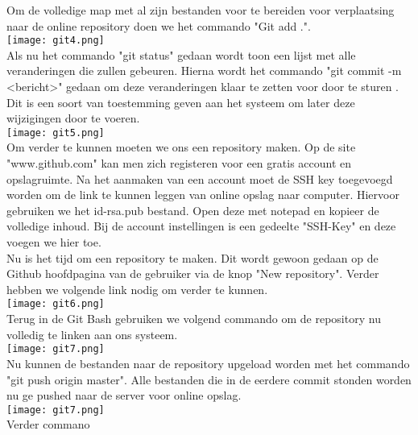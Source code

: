 Om de volledige map met al zijn bestanden voor te bereiden voor verplaatsing naar de online repository doen we het commando "Git add .".\\
\texttt{[image: git4.png]}\\

Als nu het commando "git status" gedaan wordt toon een lijst met alle veranderingen die zullen gebeuren. Hierna wordt het commando "git commit -m <bericht>" gedaan om deze veranderingen klaar te zetten voor door te sturen . Dit is een soort van toestemming geven aan het systeem om later deze wijzigingen door te voeren.\\
\texttt{[image: git5.png]}\\

Om verder te kunnen moeten we ons een repository maken. Op de site "www.github.com" kan men zich registeren voor een gratis account en opslagruimte. Na het aanmaken van een account moet de SSH key toegevoegd worden om de link te kunnen leggen van online opslag naar computer. Hiervoor gebruiken we het id-rsa.pub bestand. Open deze met notepad en kopieer de volledige inhoud. Bij de account instellingen is een gedeelte "SSH-Key" en deze voegen we hier toe.\\

Nu is het tijd om een repository te maken. Dit wordt gewoon gedaan op de Github hoofdpagina van de gebruiker via de knop "New repository". Verder hebben we volgende link nodig om verder te kunnen.\\
\texttt{[image: git6.png]}\\

Terug in de Git Bash gebruiken we volgend commando om de repository nu volledig te linken aan ons systeem.\\
\texttt{[image: git7.png]}\\

Nu kunnen de bestanden naar de repository upgeload worden met het commando "git push origin master". Alle bestanden die in de eerdere commit stonden worden nu ge pushed naar de server voor online opslag.\\
\texttt{[image: git7.png]}\\

Verder commano



